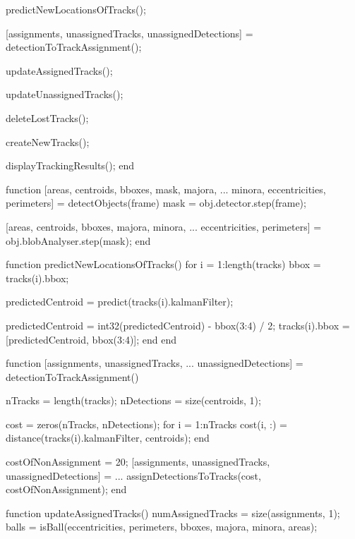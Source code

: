 \documentclass[10pt,a4paper]{article}
\begin{document}
\begin{verbatimtab}[2]
		predictNewLocationsOfTracks();

		[assignments, unassignedTracks, unassignedDetections] = detectionToTrackAssignment();

		updateAssignedTracks();

		updateUnassignedTracks();

		deleteLostTracks();

		createNewTracks();

		displayTrackingResults();
	end

	function [areas, centroids, bboxes, mask, majora, ...
			  minora, eccentricities, perimeters] = detectObjects(frame)
		mask = obj.detector.step(frame);

		[areas, centroids, bboxes, majora, minora, ...
		eccentricities, perimeters] = obj.blobAnalyser.step(mask);
	end

	function predictNewLocationsOfTracks()
		for i = 1:length(tracks)
			bbox = tracks(i).bbox;

			predictedCentroid = predict(tracks(i).kalmanFilter);

			predictedCentroid = int32(predictedCentroid) - bbox(3:4) / 2;
			tracks(i).bbox = [predictedCentroid, bbox(3:4)];
		end
	end

	function [assignments, unassignedTracks, ...
			  unassignedDetections] = detectionToTrackAssignment()

		nTracks = length(tracks);
		nDetections = size(centroids, 1);

		cost = zeros(nTracks, nDetections);
		for i = 1:nTracks
			cost(i, :) = distance(tracks(i).kalmanFilter, centroids);
		end

		costOfNonAssignment = 20;
		[assignments, unassignedTracks, unassignedDetections] = ...
			assignDetectionsToTracks(cost, costOfNonAssignment);
	end

	function updateAssignedTracks()
		numAssignedTracks = size(assignments, 1);
		balls = isBall(eccentricities, perimeters, bboxes, majora, minora, areas);


\end{verbatimtab}
\end{document}
